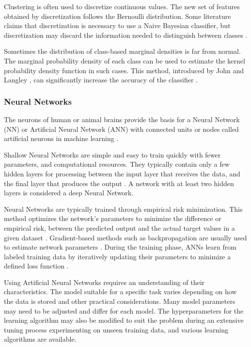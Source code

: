 \documentclass[sn-mathphys-num]{sn-jnl}%
\begin{document}
Clustering is often used to discretize continuous values. The new set of features obtained by discretization follows the Bernoulli distribution. Some literature claims that discretization is necessary to use a Naive Bayesian classifier, but discretization may discard the information needed to distinguish between classes \cite{Hand2001}.

Sometimes the distribution of class-based marginal densities is far from normal. The marginal probability density of each class can be used to estimate the kernel probability density function in such cases. This method, introduced by John and Langley \cite{John2013}, can significantly increase the accuracy of the classifier \cite{Piryonesi2020, Hastie2009}.

\subsubsection{Neural Networks}

The neurons of human or animal brains provide the basis for a Neural Network (NN) or Artificial Neural Network (ANN) with connected units or nodes called artificial neurons in machine learning \cite{mitExplainedNeural, brahme2014comprehensive}. 

Shallow Neural Networks are simple and easy to train quickly with fewer parameters, and computational resources. They typically contain only a few hidden layers for processing between the input layer that receives the data, and the final layer that produces the output \cite{olden2002illuminating, ozesmi1999artificial}.  A network with at least two hidden layers \cite{bishop2006pattern} is considered a deep Neural Network.

Neural Networks are typically trained through empirical risk minimization. This method optimizes the network's parameters to minimize the difference or empirical risk, between the predicted output and the actual target values in a given dataset \cite{vapnik2013nature}. Gradient-based methods such as backpropagation are usually used to estimate network parameters  \cite{vapnik2013nature}. During the training phase, ANNs learn from labeled training data by iteratively updating their parameters to minimize a defined loss function \cite{goodfellow2016deep}.

Using Artificial Neural Networks requires an understanding of their characteristics. The model suitable for a specific task varies depending on how the data is stored and other practical considerations. Many model parameters may need to be adjusted and differ for each model. The hyperparameters for the learning algorithm may also be modified to suit the problem \cite{probst2019tunability} during an extensive tuning process experimenting on unseen training data, and various learning algorithms are available.
\end{document}
